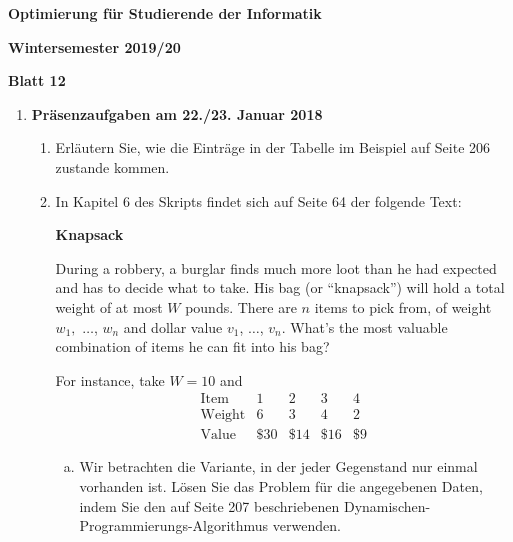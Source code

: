 \documentclass[11pt, a4paper]{article}
\begin{document}
\begin{center}
\begin{Large}
\textbf{Optimierung für Studierende der Informatik}
\end{Large}

\textbf{}
	
\vspace{0.5cm}

\textbf{Wintersemester 2019/20}

\textbf{Blatt 12}

\vspace{0.5cm}
\end{center}

\small

\begin{enumerate}[\bfseries A:]


\item \textbf{Präsenzaufgaben am 22./23. Januar 2018}

\begin{enumerate}[\bfseries 1.]

\item Erläutern Sie, wie die Einträge in der Tabelle im Beispiel auf Seite 206 zustande kommen.

\item In Kapitel 6 des Skripts findet sich auf Seite 64 der folgende Text:

\smallskip
\textbf{Knapsack}

During a robbery, a burglar finds much more loot than he had expected and has to decide what to take. His bag (or \enquote{knapsack}) will hold a total weight of at most $W$ pounds. There are $n$ items to pick from, of weight $w_1,$ $\ldots$, $w_n$ and dollar value $v_1$, $\dots$, $v_n$. What's the most valuable combination of items he can fit into his bag?

For instance, take $W=10$ and
\[
\begin{array}{c||c|c|c|c}
\text{Item}   & 1 & 2 & 3 & 4 \\ \hline\hline
\text{Weight} & 6 & 3 & 4 & 2 \\ \hline
\text{Value}  & \$30 & \$14 & \$16 & \$9
\end{array}
\]

\medskip

\begin{enumerate}[a)]
\item Wir betrachten die Variante, in der jeder Gegenstand nur einmal vorhanden ist. Lösen Sie das Problem für die angegebenen Daten, indem Sie den auf Seite 207 beschriebenen Dynamischen-Programmierungs-Algorithmus verwenden.


\end{enumerate}
\end{enumerate}
\end{enumerate}
\end{document}

